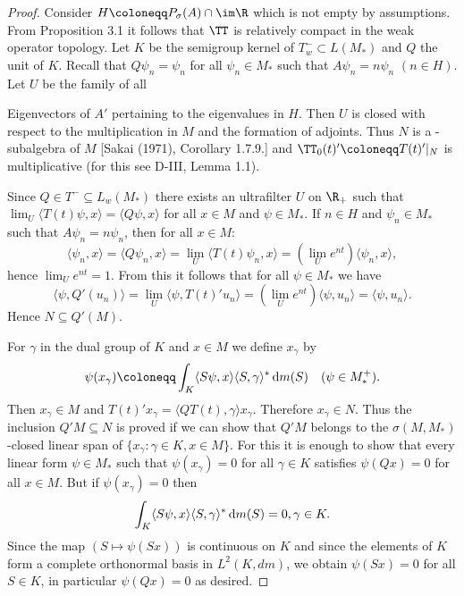 \begin{proof}
Consider $H \coloneqq P_{\sigma}(A) \cap \im\R$ which is not empty by assumptions.
From Proposition 3.1 it follows that $\TT$ is relatively compact in the weak operator topology.
Let $K$ be the semigroup kernel of $T^{-}_{w} \subset L(M_{*})$ and $Q$ the unit of $K$.
Recall that $Q\psi_{n} = \psi_{n}$ for all $\psi_{n} \in M_{*}$ such that $A\psi_{n} = n\psi_{n}$ $(n \in H)$.
Let $U$ be the family of all


\newpage

Eigenvectors of $A'$ pertaining to the eigenvalues in $H$.
Then $U$ is closed with respect to the multiplication in $M$ and the formation of adjoints.
Thus $N$ is a \WA-subalgebra of $M$ [Sakai (1971), Corollary 1.7.9.] and $\TT_{0}(t)' \coloneqq T(t)'|_{N}$ is multiplicative (for this see D-III, Lemma 1.1).

Since $Q \in T^{-} \subseteq L_{w}(M_{*})$ there exists an ultrafilter $U$ on $\R_{+}$ such that $\lim_{U}\langle T(t)\psi,x\rangle = \langle Q\psi,x\rangle$ for all $x \in M$ and $\psi \in M_{*}$.
If $n \in H$ and $\psi_{n} \in M_{*}$ such that $A\psi_{n} = n\psi_{n}$, then for all $x \in M$:
\[
\langle\psi_{n},x\rangle = \langle Q\psi_{n},x\rangle = \lim_{U} \langle T(t)\psi_{n},x\rangle = (\lim_{U} e^{nt})\langle\psi_{n},x\rangle,
\]
hence $\lim_{U} e^{nt} = 1$.
From this it follows that for all $\psi \in M_{*}$ we have
\[
\langle\psi,Q'(u_{n})\rangle = \lim_{U} \langle\psi,T(t)'u_{n}\rangle = (\lim_{U} e^{nt})\langle\psi,u_{n}\rangle = \langle\psi,u_{n}\rangle.
\]
Hence $N \subseteq Q'(M)$.

For $\gamma$ in the dual group of $K$ and $x \in M$ we define $x_{\gamma}$ by
\[
\psi(x_{\gamma}) \coloneqq \int_{K} \langle S\psi,x\rangle\langle S,\gamma\rangle^{*} \dm (S) \quad (\psi \in M_{*}^{+}).
\]
Then $x_{\gamma} \in M$ and $T(t)'x_{\gamma} = \langle QT(t),\gamma\rangle x_{\gamma}$.
Therefore $x_{\gamma} \in N$.
Thus the inclusion $Q'M \subseteq N$ is proved if we can show that $Q'M$ belongs to the $\sigma(M,M_{*})$-closed linear span of $\{x_{\gamma} \colon \gamma \in K, x \in M\}$.
For this it is enough to show that every linear form $\psi \in M_{*}$ such that $\psi(x_{\gamma}) = 0$ for all $\gamma \in K$ satisfies $\psi(Qx) = 0$ for all $x \in M$.
But if $\psi(x_{\gamma}) = 0$ then
\[
\int_{K} \langle S\psi,x\rangle\langle S,\gamma\rangle^{*} \mathop{}\!\mathrm{d}{m} (S) = 0, \gamma \in K.
\]
Since the map $(S \mapsto \psi(Sx))$ is continuous on $K$ and since the elements of $K$ form a complete orthonormal basis in $L^2(K,dm)$, we obtain $\psi(Sx) = 0$ for all $S \in K$, in particular $\psi(Qx) = 0$ as desired.


\end{proof}
